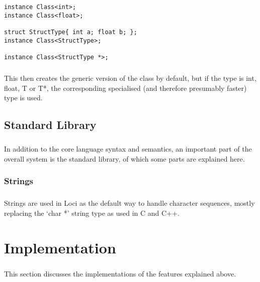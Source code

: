 \documentclass[12pt,twoside,notitlepage]{report}
\begin{document}
\small{
\begin{verbatim}
instance Class<int>;
instance Class<float>;

struct StructType{ int a; float b; };
instance Class<StructType>;

instance Class<StructType *>;
\end{verbatim}
}

\paragraph{}
This then creates the generic version of the class by default, but if the type is int, float, T or T*, the corresponding specialised (and therefore presumably faster) type is used.

\section{Standard Library}

\paragraph{}
In addition to the core language syntax and semantics, an important part of the overall system is the standard library, of which some parts are explained here.

\subsection{Strings}

\paragraph{}
Strings are used in Loci as the default way to handle character sequences, mostly replacing the `char *' string type as used in C and C++.

\cleardoublepage

\chapter{Implementation}

\paragraph{}
This section discusses the implementations of the features explained above.
\end{document}
